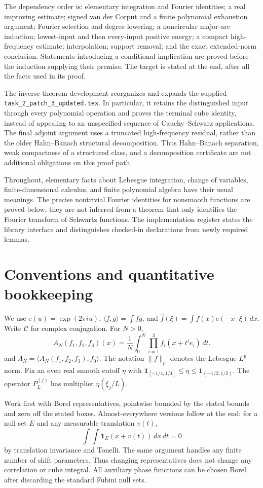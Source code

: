 \documentclass[11pt]{article}
\theoremstyle{definition}
\newcommand{\ee}[1]{\mathrm e\!\left(#1\right)}
\newcommand{\pid}[1]{\nolinkurl{#1}}
\begin{document}
The dependency order is: elementary integration and Fourier identities; a real improving estimate;
signed van der Corput and a finite polynomial exhaustion argument; Fourier selection and degree lowering;
a noncircular major-arc induction; lowest-input and then every-input positive energy;
a compact high-frequency estimate; interpolation; support removal; and the exact extended-norm conclusion.
Statements introducing a conditional implication are proved before the induction supplying their premise.
The target is stated at the end, after all the facts used in its proof.

The inverse-theorem development reorganizes and expands the supplied \pid{task_2_patch_3_updated.tex}.
In particular, it retains the distinguished input through every polynomial operation and proves the
terminal cube identity, instead of appealing to an unspecified sequence of Cauchy--Schwarz applications.
The final adjoint argument uses a truncated high-frequency residual, rather than the older
Hahn--Banach structural decomposition. Thus Hahn--Banach separation, weak compactness of a
structured class, and a decomposition certificate are not additional obligations on this proof path.

Throughout, elementary facts about Lebesgue integration, change of variables, finite-dimensional
calculus, and finite polynomial algebra have their usual meanings. The precise nontrivial Fourier
identities for nonsmooth functions are proved below; they are not inferred from a theorem that only
identifies the Fourier transform of Schwartz functions. The implementation register states the
library interface and distinguishes checked-in declarations from newly required lemmas.


\section{Conventions and quantitative bookkeeping}\label{patch:conventions}
We use $\ee u=\exp(2\pi i u)$, $\langle f,g\rangle=\int f\overline g$, and
$\widehat f(\xi)=\int f(x)\ee{-x\cdot\xi}\,dx$.  Write $\mathcal C$ for complex conjugation.
For $N>0$,
\[
 A_N(f_1,f_2,f_3)(x)=\frac1N\int_0^N\prod_{i=1}^3f_i(x+t^ie_i)\,dt.
\]
and $\Lambda_N=\langle A_N(f_1,f_2,f_3),f_0\rangle$.
The notation $\|f\|_p$ denotes the Lebesgue $L^p$ norm.
Fix an even real smooth cutoff $\eta$ with
$\mathbf1_{[-1/4,1/4]}\leq\eta\leq\mathbf1_{(-1/2,1/2)}$.
The operator $P_L^{(j)}$ has multiplier $\eta(\xi_j/L)$.

Work first with Borel representatives, pointwise bounded by the stated bounds and zero off
the stated boxes.  Almost-everywhere versions follow at the end: for a null set $E$ and any
measurable translation $v(t)$,
\[
 \int\!\int\mathbf1_E(x+v(t))\,dx\,dt=0
\]
by translation invariance and Tonelli.  The same argument handles any finite number of shift
parameters.  Thus changing representatives does not change any correlation or cube integral.
All auxiliary phase functions can be chosen Borel after discarding the standard Fubini null
sets.
\end{document}
